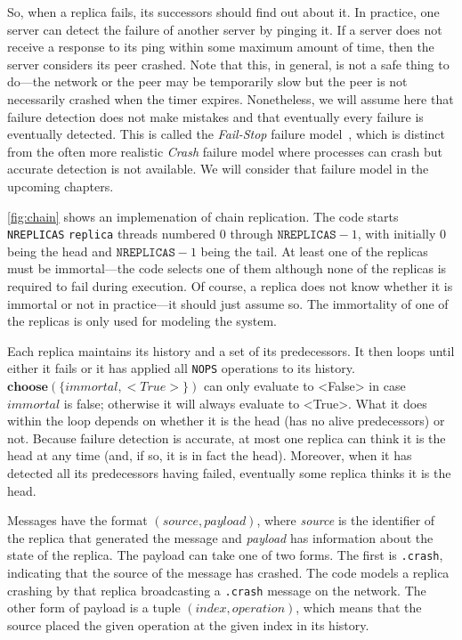 \documentclass{report}
\begin{document}
{So, when a replica fails, its successors should find out about it.
In practice, one server can detect the failure of another server by
pinging it.  If a server does not receive a response to its ping within
some maximum amount of time, then the server considers its peer crashed.
Note that this, in general, is not a safe thing to do---the network or
the peer may be temporarily slow but the peer is not necessarily crashed
when the timer expires.
Nonetheless, we will assume here that failure detection does not make
mistakes and that eventually every failure is eventually detected.
This is called the \emph{Fail-Stop} failure model~\cite{SS83},
which is distinct from the often more realistic \emph{Crash} failure model
where processes can crash but accurate detection is not available.
We will consider that failure model in the upcoming chapters.

\autoref{fig:chain} shows an implemenation of chain replication.
The code starts \texttt{NREPLICAS} \texttt{replica} threads numbered
0 through $\mathtt{NREPLICAS} - 1$, with initially 0 being the head
and $\mathtt{NREPLICAS} - 1$ being the tail.  At least one of the replicas 
must be immortal---the code selects one of them although none of the
replicas is required to fail during execution.
Of course, a replica does not know whether it is immortal
or not in practice---it should just assume so.
The immortality of one of the replicas is only used for modeling the system.

Each replica maintains its history and a set of its predecessors.
It then loops until either it fails or it has applied all
\texttt{NOPS} operations to its history.
$\mathbf{choose}(\{ \mathit{immortal}, <{True}> \})$ can only
evaluate to <{False}> in case $\textit{immortal}$ is false; otherwise
it will always evaluate to <{True}>.
What it does within the loop depends on whether it is the head
(has no alive predecessors) or not.
Because failure detection is accurate, at most one replica can think
it is the head at any time (and, if so, it is in fact the head).
Moreover, when it has
detected all its predecessors having failed, eventually some replica
thinks it is the head.

Messages have the format $(\mathit{source}, \mathit{payload})$,
where \textit{source} is the identifier of the replica that generated
the message and \textit{payload} has information about the state of
the replica.  The payload can take one of two forms.  The first is
\texttt{.crash}, indicating that the source of the message has
crashed.  The code models a replica crashing by that replica broadcasting
a \texttt{.crash} message on the network.
The other form of payload is a tuple
$(\mathit{index}, \mathit{operation})$, which means that the source
placed the given operation at the given index in its history.

}
\end{document}
